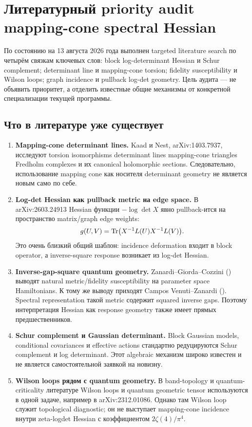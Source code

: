\chapter{Литературный priority audit mapping-cone spectral Hessian}

По состоянию на 13 августа 2026 года выполнен targeted literature search по
четырём связкам ключевых слов: block log-determinant Hessian и Schur
complement; determinant line и mapping-cone torsion; fidelity susceptibility
и Wilson loops; graph incidence и pullback log-det geometry. Цель аудита ---
не объявить приоритет, а отделить известные общие механизмы от конкретной
специализации текущей программы.

\section{Что в литературе уже существует}

\begin{enumerate}
 \item \textbf{Mapping-cone determinant lines.}
 Kaad и Nest, arXiv:1403.7937, исследуют torsion isomorphisms determinant
 lines mapping-cone triangles Fredholm complexes и их canonical holomorphic
 sections. Следовательно, использование mapping cone как носителя
 determinant geometry не является новым само по себе.

 \item \textbf{Log-det Hessian как pullback metric на edge space.}
 В arXiv:2603.24913 Hessian функции \(-\log\det X\) явно pullback-ится на
 пространство matrix/graph edge weights:
 \begin{equation}
  g(U,V)=\operatorname{Tr}\bigl(X^{-1}L(U)X^{-1}L(V)\bigr).
 \end{equation}
 Это очень близкий общий шаблон: incidence deformation входит в block
 operator, а inverse-square response возникает из log-det Hessian.

 \item \textbf{Inverse-gap-square quantum geometry.}
 Zanardi--Giorda--Cozzini () выводят
 natural metric/fidelity susceptibility на parameter space Hamiltonians.
 К тому же выводу приходят Campos Venuti--Zanardi
 (). Spectral representation
 такой metric содержит squared inverse gaps. Поэтому интерпретация Hessian
 как response geometry также имеет прямых предшественников.

 \item \textbf{Schur complement и Gaussian determinant.}
 Block Gaussian models, conditional covariances и effective actions
 стандартно редуцируются Schur complement и log determinant. Этот
 algebraic механизм широко известен и не является самостоятельной заявкой
 на новизну.

 \item \textbf{Wilson loops рядом с quantum geometry.}
 В band-topology и quantum-criticality литературе Wilson loops и quantum
 geometric tensor используются в одной задаче, например в arXiv:2312.01086.
 Однако там Wilson loop служит topological diagnostic; он не выступает
 mapping-cone incidence внутри zeta-logdet Hessian с коэффициентом
 \(2\zeta(4)/\pi^4\).
\end{enumerate}

